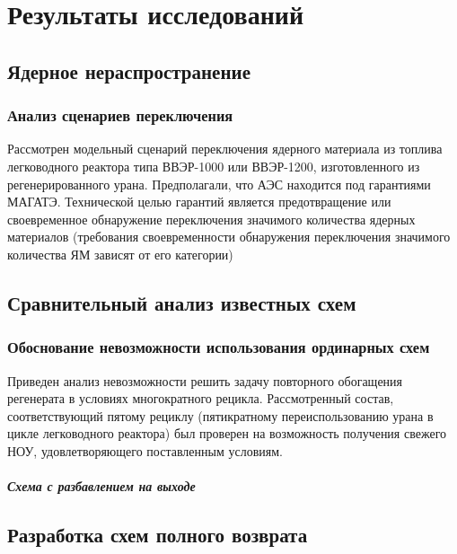 \chapter{Результаты исследований}\label{ch:ch1}

\section{Ядерное нераспространение}\label{sec:ch1/sec1}
\subsection{Анализ сценариев переключения}\label{sec:ch1/sec1}

Рассмотрен модельный сценарий переключения ядерного материала из топлива легководного реактора типа ВВЭР-1000 или ВВЭР-1200,  изготовленного из регенерированного урана. Предполагали, что АЭС находится под гарантиями МАГАТЭ. Технической целью гарантий является предотвращение или своевременное обнаружение переключения значимого количества ядерных материалов (требования своевременности обнаружения переключения значимого количества ЯМ зависят от  его категории)

\section{Сравнительный анализ известных схем}\label{sec:ch2/sec1}
\subsection{Обоснование невозможности использования ординарных схем}\label{sec:ch1/sec1}
Приведен анализ невозможности решить задачу повторного обогащения регенерата в условиях многократного рецикла. Рассмотренный состав, соответствующий пятому рециклу (пятикратному переиспользованию урана в цикле легководного реактора) был проверен на возможность получения свежего НОУ, удовлетворяющего поставленным условиям.
\paragraph{Схема с разбавлением на выходе}

\section{Разработка схем полного возврата}\label{sec:ch1/sec1}
